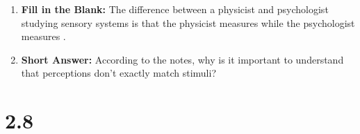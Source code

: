 \begin{enumerate}[label=\textbf{Q2.7.\arabic*}]
      \item \textbf{Fill in the Blank:} The difference between a physicist and psychologist studying sensory systems is that the physicist measures  while the psychologist measures . \\
            
      \item \textbf{Short Answer:} According to the notes, why is it important to understand that perceptions don't exactly match stimuli? \\
\end{enumerate}

\newpage

\squigglyline


\section*{2.8}

